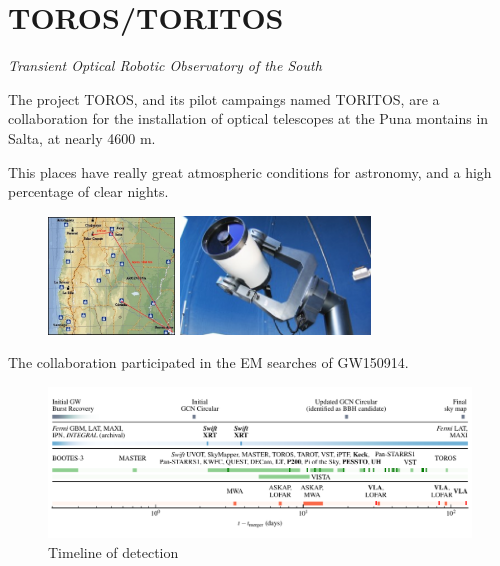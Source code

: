 \documentclass[10pt]{beamer}
\begin{document}
\section{TOROS/TORITOS}
\begin{frame}
\textit{Transient Optical Robotic Observatory of the South}

The project TOROS, and its pilot campaings named 
TORITOS, are a collaboration for the installation of optical
telescopes at the Puna montains in Salta, at nearly 4600 m.

This places have really great atmospheric conditions for astronomy, 
and a high percentage of clear nights.

\begin{figure}
 \centering
 \includegraphics[bb=0 0 400 372, width=0.3\textwidth]{./slides/plots/Site.jpg}
 \includegraphics[bb=0 0 159 99, width=0.45\textwidth]{./slides/plots/toritos_1.png}
\end{figure}
\end{frame}
\begin{frame}
 The collaboration participated in the EM searches of GW150914.
 \begin{figure}
 \centering
 \includegraphics[width=\textwidth]{./slides/plots/160208492v4/timeline.pdf}
 \caption{Timeline of detection}
 \label{fig:timeline}
\end{figure}
\end{frame}
\end{document}
